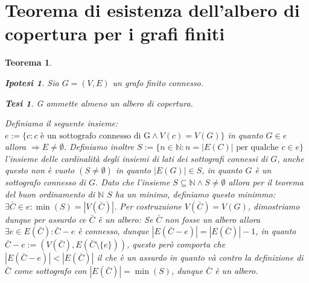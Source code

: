 \documentclass{article}
\makeatletter
\renewenvironment{proof}[1][\proofname]{\par
    \pushQED{\qed}%
    \normalfont \topsep6\p@\@plus6\p@\relax
    \trivlist
    \item\relax
    {\itshape
    #1\@addpunct{.}}\hspace\labelsep\ignorespaces
    }{%
    \popQED\endtrivlist\@endpefalse
}
\newtheorem{theorem}{Teorema}[part]
\newtheorem{ipothesis}[lemma]{Ipotesi}
\newtheorem{thesis}[lemma]{Tesi}
\newcommand{\N}{\mathbb{N}}
\makeatother
\begin{document}
    \section{Teorema di esistenza dell'albero di copertura per i grafi finiti}
        \begin{theorem}
            \begin{ipothesis}
                Sia \(G=(V,E)\) un grafo finito connesso.
            \end{ipothesis}
            \begin{thesis}
                G ammette almeno un albero di copertura.
            \end{thesis}
            \begin{proof}
                Definiamo il seguente insieme:\(e:=\{c:c\text{ è un sottografo connesso di G} \land V(c)=V(G)\}\) in quanto \(G\in e\) allora \(\Rightarrow E\neq \emptyset\). Definiamo inoltre \(S:=\{n\in\N: n=|E(C)| \text{ per qualche } c\in e\}\) l'insieme delle cardinalità degli insiemi di lati dei sottografi connessi di \(G\), anche questo non è vuoto \((S\neq \emptyset)\) in quanto \(|E(G)|\in S\), in quanto \(G\) è un sottografo connesso di \(G\).
                Dato che l'insieme \(S\subseteq \N\land S\neq \emptyset\) allora per il teorema del buon ordinamento di \(\N\) \(S\) ha un minimo, definiamo questo minimmo: \(\exists\bar{C}\in e: \min(S)=\left|V(\bar{C})\right|\).
                Per costruzuione \(V(\bar{C})=V(G)\), dimostriamo dunque per assurdo ce \(\bar{C}\) è un albero:
                Se \(\bar{C}\) non fosse un albero allora \(\exists e\in E(\bar{C}):\bar{C}-e\)  è connesso, dunque \(\left|E(\bar{C}-e)\right|=\left|E(\bar{C})\right|-1\), in quanto \(\bar{C}-e:=(V(\bar{C}),E(\bar{C}\setminus \{e\}))\), questo però comporta che \(\left|E(\bar{C}-e)\right|<\left|E(\bar{C})\right|\) il che è un assurdo in quanto và contro la definizione di \(\bar{C}\) come sottografo con \(\left|E(\bar{C})\right|=\min(S)\), dunque \(\bar{C}\) è un albero.
                \pushQED{}
            \end{proof}
            \raggedleft{{\ensuremath{\blacksquare}}}
        \end{theorem}
\end{document}
